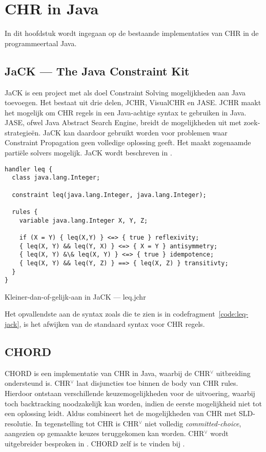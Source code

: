 \chapter{CHR in Java} \label{chap:chr-java}

In dit hoofdstuk wordt ingegaan op de bestaande implementaties van CHR in de programmeertaal Java. 

\section{JaCK --- The Java Constraint Kit}

JaCK is een project met als doel Constraint Solving mogelijkheden aan Java toevoegen. Het bestaat uit drie delen, JCHR, VisualCHR en JASE. JCHR maakt het mogelijk om CHR regels in een Java-achtige syntax te gebruiken in Java. JASE, ofwel Java Abstract Search Engine, breidt de mogelijkheden uit met zoek-strategie\"en. JaCK kan daardoor gebruikt worden voor problemen waar Constraint Propagation geen volledige oplossing geeft. Het maakt zogenaamde parti\"ele solvers mogelijk. JaCK wordt beschreven in \cite{jack}.
\begin{exCode}[bhp]
\begin{Verbatim}[frame=single]
handler leq {
  class java.lang.Integer;
  
  constraint leq(java.lang.Integer, java.lang.Integer);
  
  rules {
    variable java.lang.Integer X, Y, Z;
    
    if (X = Y) { leq(X,Y) } <=> { true } reflexivity;
    { leq(X, Y) && leq(Y, X) } <=> { X = Y } antisymmetry;
    { leq(X, Y) &\& leq(X, Y) } <=> { true } idempotence;
    { leq(X, Y) && leq(Y, Z) } ==> { leq(X, Z) } transitivty;
  }
}
\end{Verbatim}
\caption{Kleiner-dan-of-gelijk-aan in JaCK --- leq.jchr}
\label{code:leq-jack}
\end{exCode}
Het opvallendste aan de syntax zoals die te zien is in codefragment~\ref{code:leq-jack}, is het afwijken van de standaard syntax voor CHR regels.

\section{CHORD}

CHORD is een implementatie van CHR in Java, waarbij de CHR$^\vee$ uitbreiding ondersteund is. CHR$^\vee$ laat disjuncties toe binnen de body van CHR rules. Hierdoor ontstaan verschillende keuzemogelijkheden voor de uitvoering, waarbij toch backtracking noodzakelijk kan worden, indien de eerste mogelijkheid niet tot een oplossing leidt. Aldus combineert het de mogelijkheden van CHR met SLD-resolutie. In tegenstelling tot CHR is CHR$^\vee$ niet volledig {\em committed-choice}, aangezien op gemaakte keuzes teruggekomen kan worden. CHR$^\vee$ wordt uitgebreider besproken in \cite{chrv}. CHORD zelf is te vinden bij \cite{chord}.

